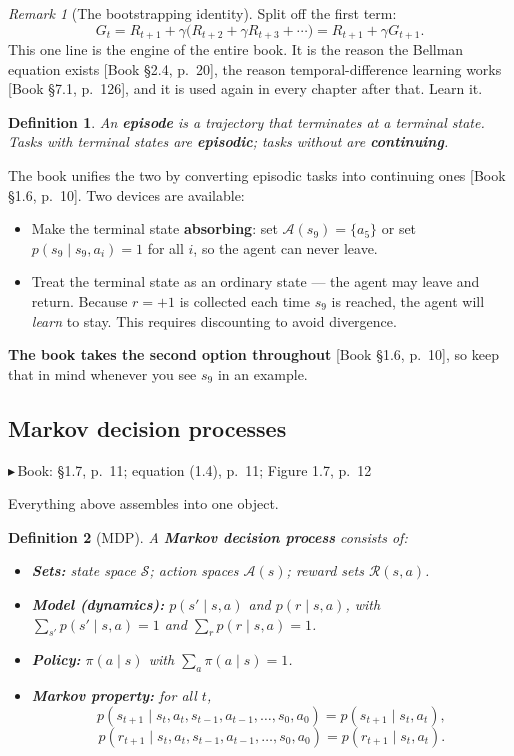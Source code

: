 \documentclass[11pt, letterpaper]{article}
\theoremstyle{runin}
\newtheorem*{definition}{Definition}
\theoremstyle{runinplain}
\theoremstyle{remark}
\newtheorem*{remark}{Remark}
\newcommand{\Sspace}{\mathcal{S}}
\newcommand{\Aspace}{\mathcal{A}}
\newcommand{\bk}[1]{{\color{bookblue}\small$\blacktriangleright$\,\textsf{Book: #1}}}
\newcommand{\bkin}[1]{{\color{bookblue}\small[\textsf{Book #1}]}}
\begin{document}
\begin{remark}[The bootstrapping identity]
Split off the first term:
\[
  G_t = R_{t+1} + \gamma\bigl(R_{t+2}+\gamma R_{t+3}+\cdots\bigr) = R_{t+1}+\gamma G_{t+1}.
\]
This one line is the engine of the entire book. It is the reason the Bellman
equation exists \bkin{\S2.4, p.~20}, the reason temporal-difference learning works
\bkin{\S7.1, p.~126}, and it is used again in every chapter after that. Learn it.
\end{remark}

\begin{definition}
An \textbf{episode} is a trajectory that terminates at a terminal state. Tasks with
terminal states are \textbf{episodic}; tasks without are \textbf{continuing}.
\end{definition}

The book unifies the two by converting episodic tasks into continuing ones
\bkin{\S1.6, p.~10}. Two devices are available:
\begin{itemize}
  \item Make the terminal state \textbf{absorbing}: set $\Aspace(s_9)=\{a_5\}$ or
        set $p(s_9\mid s_9,a_i)=1$ for all $i$, so the agent can never leave.
  \item Treat the terminal state as an ordinary state --- the agent may leave and
        return. Because $r=+1$ is collected each time $s_9$ is reached, the agent
        will \emph{learn} to stay. This requires discounting to avoid divergence.
\end{itemize}
\textbf{The book takes the second option throughout} \bkin{\S1.6, p.~10}, so keep
that in mind whenever you see $s_9$ in an example.

\subsection{Markov decision processes}

\bk{\S1.7, p.~11; equation (1.4), p.~11; Figure 1.7, p.~12}

Everything above assembles into one object.

\begin{definition}[MDP]
A \textbf{Markov decision process} consists of:
\begin{itemize}
  \item \textbf{Sets:} state space $\Sspace$; action spaces $\Aspace(s)$; reward
        sets $\mathcal{R}(s,a)$.
  \item \textbf{Model (dynamics):} $p(s'\mid s,a)$ and $p(r\mid s,a)$, with
        $\sum_{s'}p(s'\mid s,a)=1$ and $\sum_{r}p(r\mid s,a)=1$.
  \item \textbf{Policy:} $\pi(a\mid s)$ with $\sum_a \pi(a\mid s)=1$.
  \item \textbf{Markov property:} for all $t$,
        \[
          p(s_{t+1}\mid s_t,a_t,s_{t-1},a_{t-1},\dots,s_0,a_0)=p(s_{t+1}\mid s_t,a_t),
        \]
        \[
          p(r_{t+1}\mid s_t,a_t,s_{t-1},a_{t-1},\dots,s_0,a_0)=p(r_{t+1}\mid s_t,a_t).
        \]
\end{itemize}
\end{definition}
\end{document}
